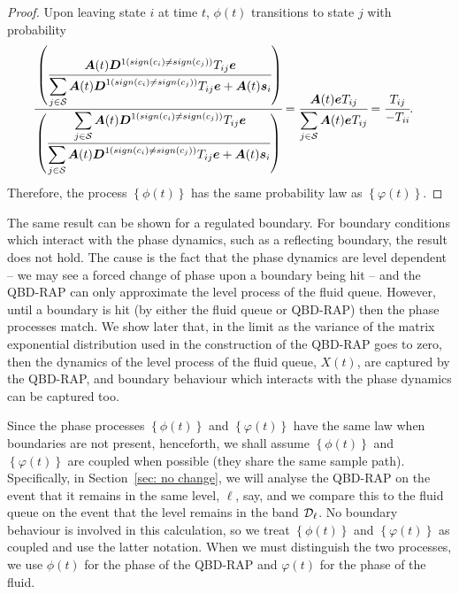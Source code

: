 \begin{proof}
	Upon leaving state \(i\) at time \(t\), \({\phi}(t)\) transitions to state \(j\) with probability 
	\begin{align*}
            	\cfrac{\left(\cfrac{\boldsymbol A(t) \boldsymbol{D}^{1(sign(c_i)\neq sign(c_j))}T_{ij}\boldsymbol e}{\displaystyle\sum_{j\in\mathcal S}\boldsymbol A(t) \boldsymbol{D}^{1(sign(c_i)\neq sign(c_j))}T_{ij}\boldsymbol e + \boldsymbol A(t) \boldsymbol s_i}\right)}
            	{\left(\cfrac{\displaystyle\sum_{j\in\mathcal S}\boldsymbol A(t) \boldsymbol{D}^{1(sign(c_i)\neq sign(c_j))}T_{ij}\boldsymbol e}{\displaystyle\sum_{j\in\mathcal S}\boldsymbol A(t) \boldsymbol{D}^{1(sign(c_i)\neq sign(c_j))}T_{ij}\boldsymbol e + \boldsymbol A(t) \boldsymbol s_i}\right)}
            	&=\cfrac{\boldsymbol A(t) \boldsymbol eT_{ij}}
            	{\displaystyle\sum_{j\in\mathcal S}\boldsymbol A(t) \boldsymbol eT_{ij}}
	= \cfrac{T_{ij}}
            	{-T_{ii}}.
	 \end{align*}
	 Therefore, the process \(\left\{{\phi}(t)\right\}\) has the same probability law as \(\left\{\varphi(t)\right\}\).
\end{proof}
\begin{rem}\label{rem: afllflflflf}
The same result can be shown for a regulated boundary. For boundary conditions which interact with the phase dynamics, such as a reflecting boundary, the result does not hold. The cause is the fact that the phase dynamics are level dependent -- we may see a forced change of phase upon a boundary being hit -- and the QBD-RAP can only approximate the level process of the fluid queue. However, until a boundary is hit (by either the fluid queue or QBD-RAP) then the phase processes match. We show later that, in the limit as the variance of the matrix exponential distribution used in the construction of the QBD-RAP goes to zero, then the dynamics of the level process of the fluid queue, \(X(t)\), are captured by the QBD-RAP, and boundary behaviour which interacts with the phase dynamics can be captured too.
\end{rem}

Since the phase processes \(\left\{{\phi}(t)\right\}\) and \(\left\{\varphi(t)\right\}\) have the same law when boundaries are not present, henceforth, we shall assume \(\left\{{\phi}(t)\right\}\) and \(\left\{\varphi(t)\right\}\) are coupled when possible (they share the same sample path). Specifically, in Section~\ref{sec: no change}, we will analyse the QBD-RAP on the event that it remains in the same level, \(\ell\), say, and we compare this to the fluid queue on the event that the level remains in the band \(\mathcal{D}_\ell\). No boundary behaviour is involved in this calculation, so we treat \(\left\{{\phi}(t)\right\}\) and \(\left\{\varphi(t)\right\}\) as coupled and use the latter notation. When we must distinguish the two processes, we use \(\phi(t)\) for the phase of the QBD-RAP and \(\varphi(t)\) for the phase of the fluid. 


